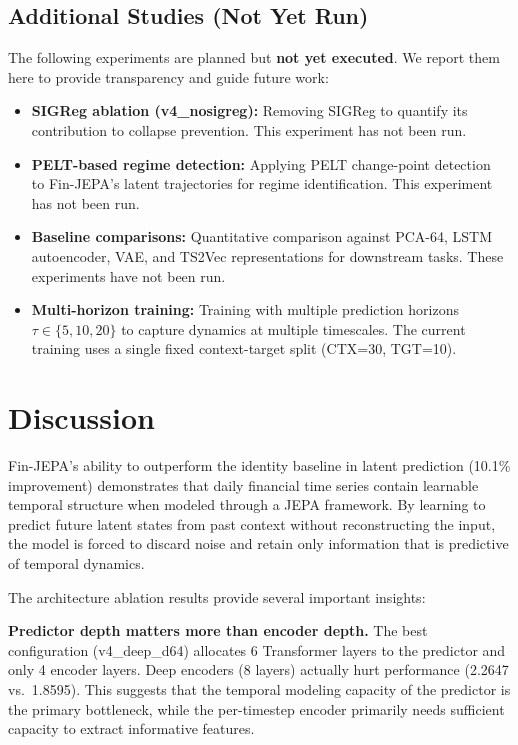 \documentclass[11pt]{article}
\begin{document}
\subsection{Additional Studies (Not Yet Run)}

The following experiments are planned but \textbf{not yet executed}. We report them here to provide transparency and guide future work:

\begin{itemize}[nosep]
  \item \textbf{SIGReg ablation (v4\_nosigreg):} Removing SIGReg to quantify its contribution to collapse prevention. This experiment has not been run.
  \item \textbf{PELT-based regime detection:} Applying PELT change-point detection~\citep{killick2012pelt} to Fin-JEPA's latent trajectories for regime identification. This experiment has not been run.
  \item \textbf{Baseline comparisons:} Quantitative comparison against PCA-64, LSTM autoencoder, VAE, and TS2Vec representations for downstream tasks. These experiments have not been run.
  \item \textbf{Multi-horizon training:} Training with multiple prediction horizons $\tau \in \{5, 10, 20\}$ to capture dynamics at multiple timescales. The current training uses a single fixed context-target split (CTX=30, TGT=10).
\end{itemize}

\section{Discussion}

Fin-JEPA's ability to outperform the identity baseline in latent prediction (10.1\% improvement) demonstrates that daily financial time series contain learnable temporal structure when modeled through a JEPA framework. By learning to predict future latent states from past context without reconstructing the input, the model is forced to discard noise and retain only information that is predictive of temporal dynamics.

The architecture ablation results provide several important insights:

\textbf{Predictor depth matters more than encoder depth.} The best configuration (v4\_deep\_d64) allocates 6 Transformer layers to the predictor and only 4 encoder layers. Deep encoders (8 layers) actually hurt performance (2.2647 vs.\ 1.8595). This suggests that the temporal modeling capacity of the predictor is the primary bottleneck, while the per-timestep encoder primarily needs sufficient capacity to extract informative features.
\end{document}
